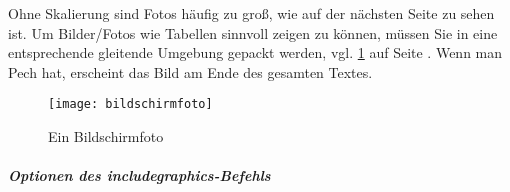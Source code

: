 \documentclass[ngerman,               %
               a4paper,               %
               fleqn,                 %
                     ]{scrartcl}       %
\begin{document}
Ohne Skalierung sind Fotos häufig zu groß, wie auf der nächsten Seite zu
sehen ist. Um Bilder/Fotos wie Tabellen sinnvoll zeigen zu können, müssen
Sie in eine entsprechende gleitende Umgebung gepackt werden,
vgl. \cref{fig:bildschirm} auf Seite \pageref{fig:bildschirm}. Wenn man
Pech hat, erscheint das Bild am Ende des gesamten Textes.
\begin{figure}[htb]
    \centering%
    \texttt{[image: bildschirmfoto]}
    \caption{Ein Bildschirmfoto} %
    \label{fig:bildschirm}
\end{figure}

\subparagraph{Optionen des includegraphics-Befehls}
\end{document}

